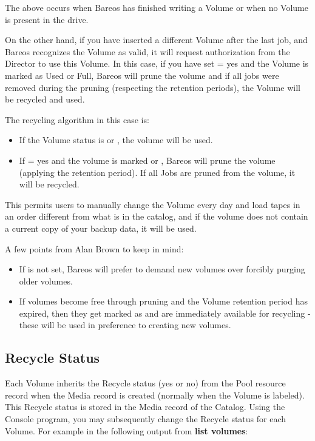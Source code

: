 The above occurs when Bareos has finished writing a Volume or when no Volume
is present in the drive.

On the other hand, if you have inserted a different Volume after the last job,
and Bareos recognizes the Volume as valid, it will request authorization from
the Director to use this Volume. In this case, if you have set 
 = yes and the Volume is marked as Used or Full, Bareos will
prune the volume and if all jobs were removed during the pruning (respecting
the retention periods), the Volume will be recycled and used.

The recycling algorithm in this case is:
\begin{itemize}
\item If the Volume status is  or , the volume  will be used.
\item If  = yes and the  volume is
    marked  or , Bareos  will prune the volume (applying the retention
   period).  If all Jobs are pruned from the volume, it will be  recycled.
\end{itemize}

This permits users to manually change the Volume every day and load tapes in
an order different from what is in the catalog, and if the volume does not
contain a current copy of your backup data, it will be used.

A few points from Alan Brown to keep in mind:

\begin{itemize}
\item If  is not set, Bareos will prefer to
  demand new volumes over forcibly purging older volumes.

\item If volumes become free through pruning and the Volume retention period has
  expired, then they get marked as  and are immediately available for
  recycling - these will be used in preference to creating new volumes.
\end{itemize}


\subsection{Recycle Status}

Each Volume inherits the Recycle status (yes or no) from the Pool resource
record when the Media record is created (normally when the Volume is labeled).
This Recycle status is stored in the Media record of the Catalog. Using
the Console program, you may subsequently change the Recycle status for each
Volume. For example in the following output from {\bf list volumes}:

